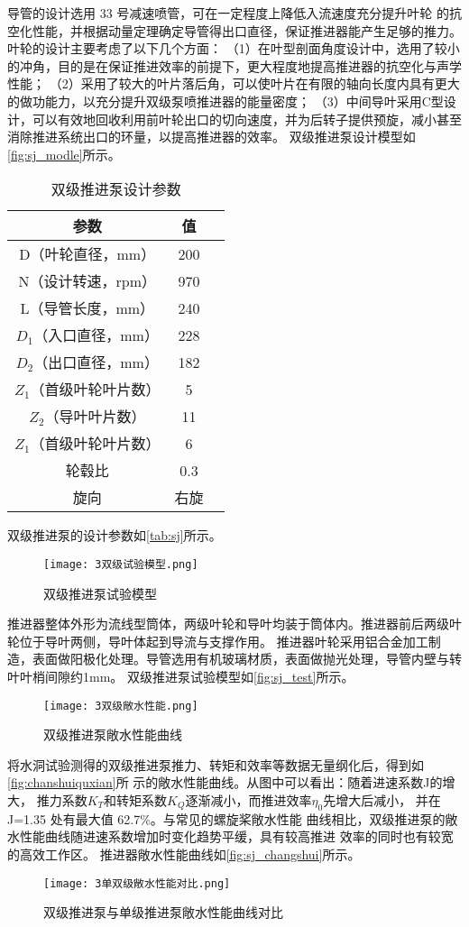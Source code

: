 导管的设计选用 33 号减速喷管，可在一定程度上降低入流速度充分提升叶轮
的抗空化性能，并根据动量定理确定导管得出口直径，保证推进器能产生足够的推力。
叶轮的设计主要考虑了以下几个方面：
（1）在叶型剖面角度设计中，选用了较小的冲角，目的是在保证推进效率的前提下，更大程度地提高推进器的抗空化与声学性能；
（2）采用了较大的叶片落后角，可以使叶片在有限的轴向长度内具有更大的做功能力，以充分提升双级泵喷推进器的能量密度；
（3）中间导叶采用C型设计，可以有效地回收利用前叶轮出口的切向速度，并为后转子提供预旋，减小甚至消除推进系统出口的环量，以提高推进器的效率。
双级推进泵设计模型如\autoref{fig:sj_modle}所示。
\begin{table}[htbp]
    \centering
    \caption{\label{tab:sj}双级推进泵设计参数}
    \begin{tabular}{ccc}
     \toprule
     参数&值\\
     \midrule
     D（叶轮直径，mm）&200\\
     N（设计转速，rpm）&970\\
     L（导管长度，mm）&240\\
     $D_1$（入口直径，mm）&228\\
     $D_2$（出口直径，mm）&182\\
     $Z_1$（首级叶轮叶片数）&5\\
     $Z_2$（导叶叶片数）&11\\
     $Z_1$（首级叶轮叶片数）&6\\
     轮毂比&0.3\\
     旋向&右旋\\
     \bottomrule
    \end{tabular}
\end{table}

双级推进泵的设计参数如\autoref{tab:sj}所示。
\begin{figure}[htbp]
    \centering
    \texttt{[image: 3双级试验模型.png]}
    \caption{\label{fig:sj_test}双级推进泵试验模型}
\end{figure}
推进器整体外形为流线型筒体，两级叶轮和导叶均装于筒体内。推进器前后两级叶轮位于导叶两侧，导叶体起到导流与支撑作用。
推进器叶轮采用铝合金加工制造，表面做阳极化处理。导管选用有机玻璃材质，表面做抛光处理，导管内壁与转叶叶梢间隙约1mm。
双级推进泵试验模型如\autoref{fig:sj_test}所示。
\begin{figure}[htbp]
    \centering
    \texttt{[image: 3双级敞水性能.png]}
    \caption{\label{fig:sj_changshui}双级推进泵敞水性能曲线}
\end{figure}

将水洞试验测得的双级推进泵推力、转矩和效率等数据无量纲化后，得到如\autoref{fig:chanshuiquxian}所
示的敞水性能曲线。从图中可以看出：随着进速系数J的增大，
推力系数$K_T$和转矩系数$K_Q$逐渐减小，而推进效率$\eta_0$先增大后减小，
并在 J=1.35 处有最大值 62.7\%。与常见的螺旋桨敞水性能
曲线相比，双级推进泵的敞水性能曲线随进速系数增加时变化趋势平缓，具有较高推进
效率的同时也有较宽的高效工作区。
推进器敞水性能曲线如\autoref{fig:sj_changshui}所示。
\begin{figure}[htbp]
    \centering
    \texttt{[image: 3单双级敞水性能对比.png]}
    \caption{\label{fig:sj_dj}双级推进泵与单级推进泵敞水性能曲线对比}
\end{figure}

